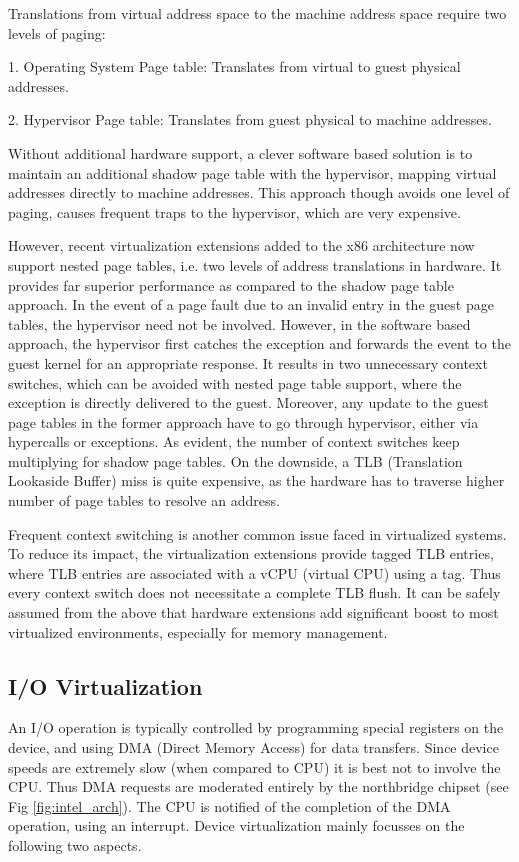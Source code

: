 Translations from virtual address space to the machine address space require two levels of paging:

1. Operating System Page table: Translates from virtual to guest physical addresses.

2. Hypervisor Page table: Translates from guest physical to machine addresses.

Without additional hardware support, a clever software based solution is to maintain an additional shadow page table with the hypervisor, mapping virtual addresses directly to machine addresses. This approach though avoids one level of paging, causes frequent traps to the hypervisor, which are very expensive.

However, recent virtualization extensions added to the x86 architecture now support nested page tables, i.e. two levels of address translations in hardware. It provides far superior performance as compared to the shadow page table approach. In the event of a page fault due to an invalid entry in the guest page tables, the hypervisor need not be involved. However, in the software based approach, the hypervisor first catches the exception and forwards the event to the guest kernel for an appropriate response. It results in two unnecessary context switches, which can be avoided with nested page table support, where the exception is directly delivered to the guest. Moreover, any update to the guest page tables in the former approach have to go through hypervisor, either via hypercalls or exceptions. As evident, the number of context switches keep multiplying for shadow page tables. On the downside, a TLB (Translation Lookaside Buffer) miss is quite expensive, as the hardware has to traverse higher number of page tables to resolve an address.

Frequent context switching is another common issue faced in virtualized systems. To reduce its impact, the virtualization extensions provide tagged TLB entries, where TLB entries are associated with a vCPU (virtual CPU) using a tag. Thus every context switch does not necessitate a complete TLB flush. It can be safely assumed from the above that hardware extensions add significant boost to most virtualized environments, especially for memory management.

\subsection{I/O Virtualization}
An I/O operation is typically controlled by programming special registers on the device, and using DMA (Direct Memory Access) for data transfers. Since device speeds are extremely slow (when compared to CPU) it is best not to involve the CPU. Thus DMA requests are moderated entirely by the northbridge chipset (see Fig \ref{fig:intel_arch}). The CPU is notified of the completion of the DMA operation, using an interrupt. Device virtualization mainly focusses on the following two aspects.

